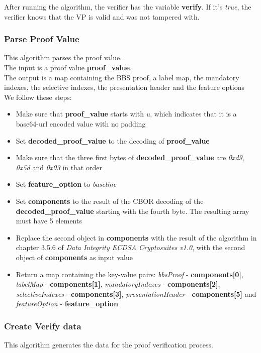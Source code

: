 \documentclass[
	a4paper               %
	,BCOR=0mm            %
	,bibliography=totoc   %
	,listof=totoc         %
	,monolingual
	,twoside=false
]{bfhthesis}              %
\begin{document}
After running the algorithm, the verifier has the variable \textbf{verify}. If it's \textit{true}, the verifier knows that the VP is valid and was not tampered with.

\subsubsection{Parse Proof Value}
\label{subsub:parseproof}
This algorithm parses the proof value.\\

The input is a proof value \textbf{proof\_value}.\\

The output is a map containing the BBS proof, a label map, the mandatory indexes, the selective indexes, the presentation header and the feature options\\

We follow these steps:
\begin{itemize}
	\item Make sure that \textbf{proof\_value} starts with \textit{u}, which indicates that it is a base64-url encoded value with no padding
	\item Set \textbf{decoded\_proof\_value} to the decoding of \textbf{proof\_value}
	\item Make sure that the three first bytes of \textbf{decoded\_proof\_value} are \textit{0xd9}, \textit{0x5d} and \textit{0x03} in that order
	\item Set \textbf{feature\_option} to \textit{baseline}
	\item Set \textbf{components} to the result of the CBOR decoding of the \textbf{decoded\_proof\_value} starting with the fourth byte. The resulting array must have 5 elements
	\item Replace the second object in \textbf{components} with the result of the algorithm in chapter 3.5.6 of \textit{Data Integrity ECDSA Cryptosuites v1.0}\cite{ecdsa}, with the second object of \textbf{components} as input value
	\item Return a map containing the key-value pairs: \textit{bbsProof} - \textbf{components[0]}, \textit{labelMap} - \textbf{components[1]}, \textit{mandatoryIndexes} - \textbf{components[2]}, \textit{selectiveIndexes} - \textbf{components[3]}, \textit{presentationHeader} - \textbf{components[5]} and \textit{featureOption} - \textbf{feature\_option}
\end{itemize}

\subsubsection{Create Verify data}
\label{subsub:createverifydata}
This algorithm generates the data for the proof verification process.\\
\end{document}
